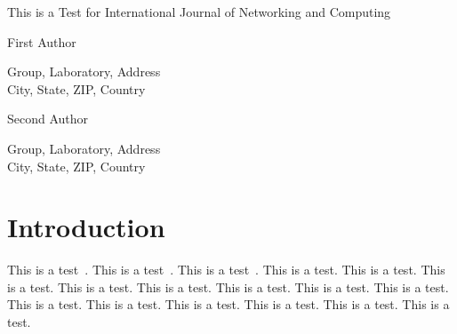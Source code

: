 \documentclass[twoside]{article}
\newcommand{\jtitle}{This is a Test for International Journal of Networking and Computing}
\begin{document}
\thispagestyle{empty}
\copyrightheader

\begin{center}
\jtitle

\vspace{20pt}

First Author

\vspace{2pt}

Group, Laboratory, Address\\
City, State, ZIP, Country

\vspace{10pt}
%
\vspace{10pt}
Second Author

\vspace{2pt}
Group, Laboratory, Address\\
City, State, ZIP, Country

\vspace{10pt}
%
%

\vspace{20pt}

\end{center}


\begin{abstract}
This is an abstract.
This is an abstract.
This is an abstract.
This is an abstract.
This is an abstract.
This is an abstract.
This is an abstract.
This is an abstract.
This is an abstract.
This is an abstract.
This is an abstract.
This is an abstract.

This is an abstract.
This is an abstract.
This is an abstract.
This is an abstract.
This is an abstract.
This is an abstract.
This is an abstract.
This is an abstract.
This is an abstract.
This is an abstract.
This is an abstract.
This is an abstract.
\end{abstract}



\section{Introduction}
This is a test~\cite{REF1}.
This is a test~\cite{REF1,REF3}.
This is a test~\cite{REF2,REF3,REF1}.
This is a test.
This is a test.
This is a test.
This is a test.
This is a test.
This is a test.
This is a test.
This is a test.
This is a test.
This is a test.
This is a test.
This is a test.
This is a test.
This is a test.
\end{document}
